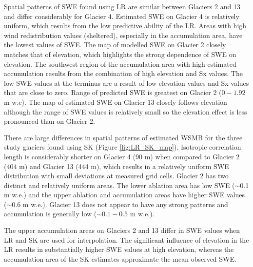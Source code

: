 \documentclass[twocolumn,letterpaper]{igs}
\begin{document}
Spatial patterns of SWE found using LR are similar between Glaciers 2 and 13 and differ considerably for Glacier 4. Estimated SWE on Glacier 4 is relatively uniform, which results from the low predictive ability of the LR. Areas with high wind redistribution values (sheltered), especially in the accumulation area, have the lowest values of SWE. The map of modelled SWE on Glacier 2 closely matches that of elevation, which highlights the strong dependence of SWE on elevation. The southwest region of the accumulation area with high estimated accumulation results from the combination of high elevation and Sx values. The low SWE values at the terminus are a result of low elevation values and Sx values that are close to zero. Range of predicted SWE is greatest on Glacier 2 ($0 - 1.92$ m w.e). The map of estimated SWE on Glacier 13 closely follows elevation although the range of SWE values is relatively small so the elevation effect is less pronounced than on Glacier 2.

There are large differences in spatial patterns of estimated WSMB for the three study glaciers found using SK (Figure \ref{fig:LR_SK_map}). Isotropic correlation length is considerably shorter on Glacier 4 (90 m) when compared to Glacier 2 (404 m) and Glacier 13 (444 m), which results in a relatively uniform SWE distribution with small deviations at measured grid cells. Glacier 2 has two distinct and relatively uniform areas. The lower ablation area has low SWE ($\sim$0.1 m w.e.) and the upper ablation and accumulation areas have higher SWE values ($\sim$0.6 m w.e.). Glacier 13 does not appear to have any strong patterns and accumulation is generally low ($\sim0.1-0.5$ m w.e.).

The upper accumulation areas on Glaciers 2 and 13 differ in SWE values when LR and SK are used for interpolation. The significant influence of elevation in the LR results in substantially higher SWE values at high elevation, whereas the accumulation area of the SK estimates approximate the mean observed SWE. 
\end{document}
